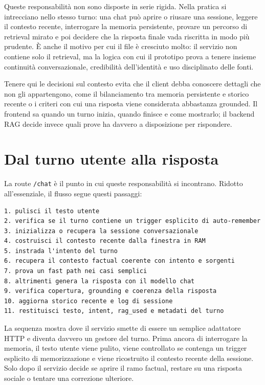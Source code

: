Queste responsabilità non sono disposte in serie rigida. Nella pratica si intrecciano nello stesso turno: una chat può aprire o riusare una sessione, leggere il contesto recente, interrogare la memoria persistente, provare un percorso di retrieval mirato e poi decidere che la risposta finale vada riscritta in modo più prudente. È anche il motivo per cui il file è cresciuto molto: il servizio non contiene solo il retrieval, ma la logica con cui il prototipo prova a tenere insieme continuità conversazionale, credibilità dell'identità e uso disciplinato delle fonti.

Tenere qui le decisioni sul contesto evita che il client debba conoscere dettagli che non gli appartengono, come il bilanciamento tra memoria persistente e storico recente o i criteri con cui una risposta viene considerata abbastanza grounded. Il frontend sa quando un turno inizia, quando finisce e come mostrarlo; il backend RAG decide invece quali prove ha davvero a disposizione per rispondere.

\section{Dal turno utente alla risposta}
La route \texttt{/chat} è il punto in cui queste responsabilità si incontrano. Ridotto all'essenziale, il flusso segue questi passaggi:

\begin{lstlisting}[basicstyle=\ttfamily\small,breaklines=true]
1. pulisci il testo utente
2. verifica se il turno contiene un trigger esplicito di auto-remember
3. inizializza o recupera la sessione conversazionale
4. costruisci il contesto recente dalla finestra in RAM
5. instrada l'intento del turno
6. recupera il contesto factual coerente con intento e sorgenti
7. prova un fast path nei casi semplici
8. altrimenti genera la risposta con il modello chat
9. verifica copertura, grounding e coerenza della risposta
10. aggiorna storico recente e log di sessione
11. restituisci testo, intent, rag_used e metadati del turno
\end{lstlisting}

La sequenza mostra dove il servizio smette di essere un semplice adattatore HTTP e diventa davvero un gestore del turno. Prima ancora di interrogare la memoria, il testo utente viene pulito, viene controllato se contenga un trigger esplicito di memorizzazione e viene ricostruito il contesto recente della sessione. Solo dopo il servizio decide se aprire il ramo factual, restare su una risposta sociale o tentare una correzione ulteriore.

